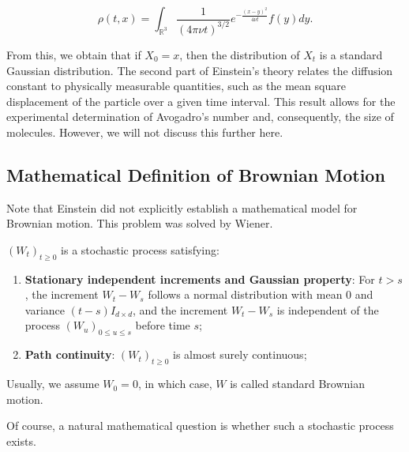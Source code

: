 \[
\rho(t,x) = \int_{\mathbb{R}^3} \frac{1}{(4\pi\nu t)^{3/2}} e^{-\frac{(x-y)^2}{4\nu t}} f(y) dy.
\]

From this, we obtain that if \( X_0 = x \), then the distribution of \( X_t \) is a standard Gaussian distribution. The second part of Einstein's theory relates the diffusion constant to physically measurable quantities, such as the mean square displacement of the particle over a given time interval. This result allows for the experimental determination of Avogadro's number and, consequently, the size of molecules. However, we will not discuss this further here.

\subsection{Mathematical Definition of Brownian Motion}

Note that Einstein did not explicitly establish a mathematical model for Brownian motion. This problem was solved by Wiener. 

\begin{definition}\label{Def:BM}
    \( (W_t)_{t\geq 0} \) is a stochastic process satisfying:
    \begin{enumerate}
        \item {\bf Stationary independent increments and Gaussian property}: For \( t > s \), the increment \( W_t - W_s \) follows a normal distribution with mean 0 and variance \( (t-s)I_{d\times d} \), and the increment \( W_t - W_s \) is independent of the process \( (W_u)_{0\leq u\leq s} \) before time \( s \);
        \item {\bf Path continuity}: \( (W_t)_{t\geq 0} \) is almost surely continuous;
    \end{enumerate}
    Usually, we assume \( W_0 = 0 \), in which case, \(W\) is called standard Brownian motion.
\end{definition} 
Of course, a natural mathematical question is whether such a stochastic process exists. 

\medskip


